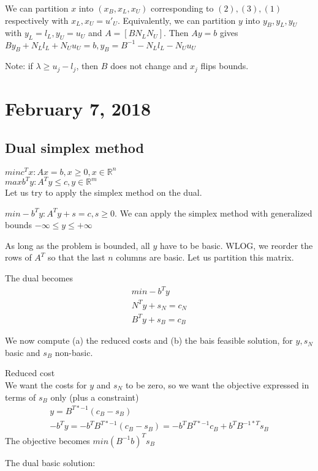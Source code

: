 \documentclass{article}
\theoremstyle{plain}
\theoremstyle{definition}
\begin{document}
We can partition $x$ into $(x_B, x_L, x_U)$ corresponding to $(2), (3), (1)$
respectively with $x_L, x_U = u'_U$. Equivalently, we can partition $y$ into
$y_B, y_L, y_U$ with $y_L = l_L, y_U = u_U$ and $A = [B N_L N_U]$. Then
$Ay = b$ gives $By_B + N_Ll_L + N_Uu_U = b, y_B = B^{-1}-N_Ll_L-N_Uu_U$

Note: if $\lambda \geq u_j - l_j$, then $B$ does not change and $x_j$ flips bounds.

\section{February 7, 2018}
\subsection{Dual simplex method}
$min c^Tx: Ax = b, x\geq 0, x\in\mathbb{R}^n$\\
$max b^Ty: A^{T}y \leq c, y\in\mathbb{R}^m$\\

Let us try to apply the simplex method on the dual.

$min -b^{T}y: A^Ty + s = c, s\geq 0$. We can apply the simplex method with generalized
bounds $-\infty \leq y\leq +\infty$

As long as the problem is bounded, all $y$ have to be basic. WLOG, we reorder the rows of
$A^T$ so that the last $n$ columns are basic. Let us partition this matrix.

The dual becomes
\begin{align}
    min -b^{T}y\\
    N^Ty + s_N  = c_N\\
    B^Ty + s_B = c_B
\end{align}

We now compute (a) the reduced costs and (b) the bais feasible solution, for
$y, s_N$ basic and $s_B$ non-basic.



Reduced cost\\
We want the costs for $y$ and $s_N$ to be zero, so we want the objective expressed
in terms of $s_B$ only (plus a constraint)
\begin{align*}
    y = B^{T*-1}(c_B - s_B)\\
    -b^{T}y = -b^{T}B^{T*-1}(c_B - s_B) = -b^{T}B^{T*-1}c_B + b^TB^{-1*T}s_B
\end{align*}
The objective becomes $min(B^{-1}b)^Ts_B$

The dual basic solution:
\end{document}
